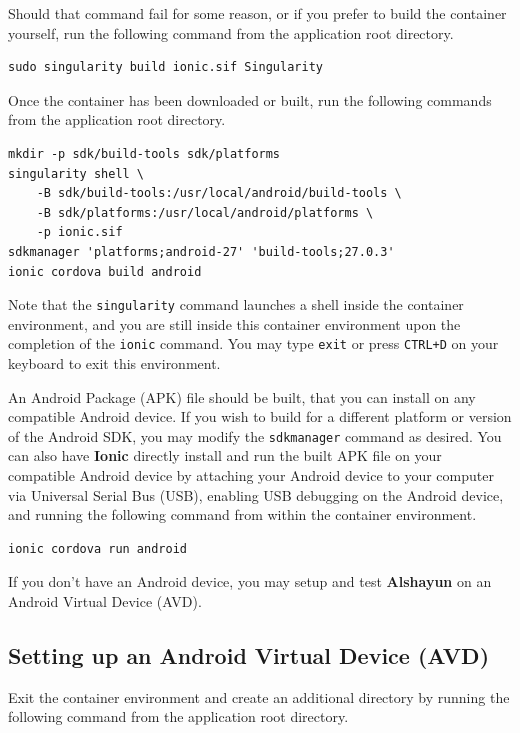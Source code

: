 \documentclass[12pt]{report}
\begin{document}
Should that command fail for some reason, or if you prefer to build the
container yourself, run the following command from the application root
directory.

\begin{verbatim}
sudo singularity build ionic.sif Singularity
\end{verbatim}

Once the container has been downloaded or built, run the following commands from
the application root directory.

\begin{verbatim}
mkdir -p sdk/build-tools sdk/platforms
singularity shell \
    -B sdk/build-tools:/usr/local/android/build-tools \
    -B sdk/platforms:/usr/local/android/platforms \
    -p ionic.sif
sdkmanager 'platforms;android-27' 'build-tools;27.0.3'
ionic cordova build android
\end{verbatim}

Note that the \texttt{singularity} command launches a shell inside the container
environment, and you are still inside this container environment upon the
completion of the \texttt{ionic} command. You may type \texttt{exit} or press
\texttt{CTRL+D} on your keyboard to exit this environment.

An Android Package (APK) file should be built, that you can install on any
compatible Android device. If you wish to build for a different platform or
version of the Android SDK, you may modify the \texttt{sdkmanager} command as
desired. You can also have \textbf{Ionic} directly install and run the built APK
file on your compatible Android device by attaching your Android device to your
computer via Universal Serial Bus (USB), enabling USB debugging on the Android
device, and running the following command from within the container environment.

\begin{verbatim}
ionic cordova run android
\end{verbatim}

If you don't have an Android device, you may setup and test \textbf{Alshayun} on
an Android Virtual Device (AVD).

        \subsection{Setting up an Android Virtual Device (AVD)}

Exit the container environment and create an additional directory by running the
following command from the application root directory.
\end{document}
